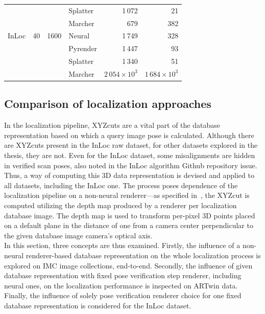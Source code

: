 \begin{table}
\begin{tabular}{l c c p{18mm} r r}
                 &    &      & Splatter & 1\,072 & 21\\
                 &    &      & Marcher  &    679 & 382\\[0.3cm]
    InLoc        & 40 & 1600 & Neural   & 1\,749 & 328\\
                 &    &      & Pyrender & 1\,447 & 93\\
                 &    &      & Splatter & 1\,340 & 51\\
                 &    &      & Marcher  & $2\,054\times10^3$ & $1\,684\times10^3$\\
    \bottomrule
    \end{tabular}
\label{tab:render_times}
\end{table}



\subsection{Comparison of localization approaches}

In the localization pipeline, XYZcuts are a vital part of the database
representation based on which a query image pose is calculated. Although
there are XYZcuts present in the InLoc raw dataset, for other datasets explored
in the thesis, they are not. Even for the InLoc dataset, some misalignments
are hidden in verified scan poses, also noted in the InLoc
algorithm Github repository issue. Thus, a way of computing this 3D data
representation is devised and applied to all datasets, including the InLoc one.
The process poses dependence of the localization
pipeline on a non-neural renderer---as specified in~,
the XYZcut is computed utilizing the depth map produced by a renderer per
localization database image. The depth map is used to transform
per-pixel 3D points placed on a default plane in the distance of one from a camera
center perpendicular to the given database image camera's optical axis.\\

In this section, three concepts are thus examined. Firstly, the influence
of a non-neural renderer-based database representation on the whole
localization process is explored on IMC image collections, end-to-end. Secondly,
the influence of given database representation with fixed pose verification step
renderer, including neural ones, on the localization performance is inspected
on ARTwin data. Finally, the influence of solely pose verification renderer
choice for one fixed database representation is considered for the InLoc dataset.\\

